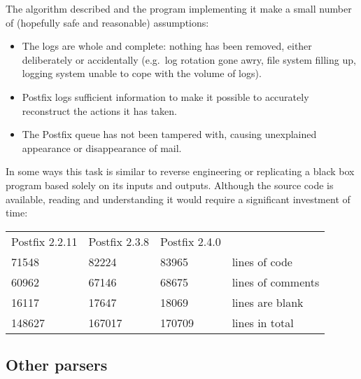 \documentclass[a4paper,12pt,draft]{article}
\begin{document}
The algorithm described and the program implementing it make a small number
of (hopefully safe and reasonable) assumptions:

\begin{itemize}

    \item The logs are whole and complete: nothing has been removed, either
        deliberately or accidentally (e.g.\ log rotation gone awry, file
        system filling up, logging system unable to cope with the volume of
        logs).

    \item Postfix logs sufficient information to make it possible to
        accurately reconstruct the actions it has taken.

    \item The Postfix queue has not been tampered with, causing unexplained
        appearance or disappearance of mail.

\end{itemize}

In some ways this task is similar to reverse engineering or replicating a
black box program based solely on its inputs and outputs.  Although the
source code is available, reading and understanding it would require a
significant investment of time:

\begin{tabular}[]{llll}

    Postfix 2.2.11  & Postfix 2.3.8   & Postfix 2.4.0 &                   \\
    71548           & 82224           & 83965         & lines of code     \\
    60962           & 67146           & 68675         & lines of comments \\
    16117           & 17647           & 18069         & lines are blank   \\
    148627          & 167017          & 170709        & lines in total    \\

\end{tabular}


\subsection{Other parsers}
\end{document}
